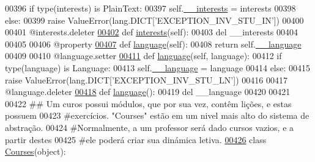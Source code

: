 \begin{DoxyCode}
00396         \textcolor{keywordflow}{if} type(interests) \textcolor{keywordflow}{is} PlainText:
00397             self.\hyperlink{classELO_1_1EntityUnit_1_1Student_a122801fcd31fe08db2f2575b38e09242}{\_\_interests} = interests
00398         \textcolor{keywordflow}{else}:
00399             \textcolor{keywordflow}{raise} ValueError(lang.DICT[\textcolor{stringliteral}{'EXCEPTION\_INV\_STU\_IN'}])
00400 
00401     @interests.deleter
\hypertarget{EntityUnit_8py_source_l00402}{}\hyperlink{classELO_1_1EntityUnit_1_1Student_a8e5d848197b740f89635152692eea39f}{00402}     \textcolor{keyword}{def }\hyperlink{classELO_1_1EntityUnit_1_1Student_a8777212f16975f658ff8f75e47f2c554}{interests}(self):
00403         del \_\_interests
00404 
00405 
00406     @property
\hypertarget{EntityUnit_8py_source_l00407}{}\hyperlink{classELO_1_1EntityUnit_1_1Student_a0af904a2855a4b3265c17a40e9b070e1}{00407}     \textcolor{keyword}{def }\hyperlink{classELO_1_1EntityUnit_1_1Student_a1492f283ebf33fe0e43f0502c82eb404}{language}(self):
00408         \textcolor{keywordflow}{return} self.\hyperlink{classELO_1_1EntityUnit_1_1Student_aec86fe5403c29d8b7354db1d81fca428}{\_\_language}
00409 
00410     @language.setter
\hypertarget{EntityUnit_8py_source_l00411}{}\hyperlink{classELO_1_1EntityUnit_1_1Student_ab427307a76034566a5ab420cd60b7c85}{00411}     \textcolor{keyword}{def }\hyperlink{classELO_1_1EntityUnit_1_1Student_a1492f283ebf33fe0e43f0502c82eb404}{language}(self, language):
00412         \textcolor{keywordflow}{if} type(language) \textcolor{keywordflow}{is} Language:
00413             self.\hyperlink{classELO_1_1EntityUnit_1_1Student_aec86fe5403c29d8b7354db1d81fca428}{\_\_language} = language
00414         \textcolor{keywordflow}{else}:
00415             \textcolor{keywordflow}{raise} ValueError(lang.DICT[\textcolor{stringliteral}{'EXCEPTION\_INV\_STU\_LN'}])
00416 
00417     @language.deleter
\hypertarget{EntityUnit_8py_source_l00418}{}\hyperlink{classELO_1_1EntityUnit_1_1Student_a1492f283ebf33fe0e43f0502c82eb404}{00418}     \textcolor{keyword}{def }\hyperlink{classELO_1_1EntityUnit_1_1Student_a1492f283ebf33fe0e43f0502c82eb404}{language}():
00419         del \_\_language
00420 
00421 
00422 \textcolor{comment}{## Um curos possui módulos, que por sua vez, contêm lições, e estas possuem}
00423 \textcolor{comment}{#exercícios. "Courses" estão em um nivel mais alto do sistema de abstração.}
00424 \textcolor{comment}{#Normalmente, a um professor será dado cursos vazios, e a partir destes }
00425 \textcolor{comment}{#ele poderá criar sua dinámica letiva.}
\hypertarget{EntityUnit_8py_source_l00426}{}\hyperlink{classELO_1_1EntityUnit_1_1Courses}{00426} \textcolor{keyword}{class }\hyperlink{classELO_1_1EntityUnit_1_1Courses}{Courses}(object):

\end{DoxyCode}

